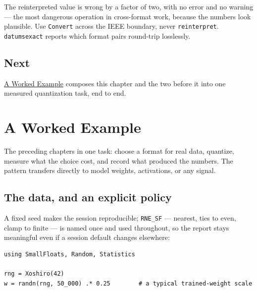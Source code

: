 The reinterpreted value is wrong by a factor of two, with no error and no warning — the most dangerous operation in cross-format work, because the numbers look plausible. Use \texttt{Convert} across the IEEE boundary, never \texttt{reinterpret}. \texttt{datumsexact} reports which format pairs round-trip losslessly.



\section{Next}



\label{9862256287407127426-dup2}{}


\href{worked\_\allowbreak{}example.md}{A Worked Example} composes this chapter and the two before it into one measured quantization task, end to end.





\chapter{A Worked Example}



\label{15995443143905973460}{}


The preceding chapters in one task: choose a format for real data, quantize, measure what the choice cost, and record what produced the numbers. The pattern transfers directly to model weights, activations, or any signal.



\section{The data, and an explicit policy}



\label{11636787435248503912}{}


A fixed seed makes the session reproducible; \texttt{RNE\_\allowbreak{}SF} — nearest, ties to even, clamp to finite — is named once and used throughout, so the report stays meaningful even if a session default changes elsewhere:




\nopagebreak[4]
\begin{verbatim}
using SmallFloats, Random, Statistics

rng = Xoshiro(42)
w = randn(rng, 50_000) .* 0.25        # a typical trained-weight scale
\end{verbatim}



